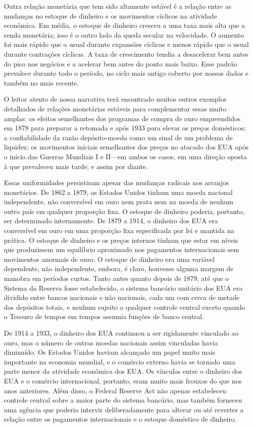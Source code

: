 \documentclass[a4paper,12pt]{article}[abntex2]
\begin{document}
Outra relação monetária que tem sido altamente estável é a relação entre as mudanças no estoque de dinheiro e os movimentos cíclicos na atividade econômica. Em média, o estoque de dinheiro cresceu a uma taxa mais alta que a renda monetária; isso é o outro lado da queda secular na velocidade. O aumento foi mais rápido que o usual durante expansões cíclicas e menos rápido que o usual durante contrações cíclicas. A taxa de crescimento tendia a desacelerar bem antes do pico nos negócios e a acelerar bem antes do ponto mais baixo. Esse padrão prevalece durante todo o período, no ciclo mais antigo coberto por nossos dados e também no mais recente.

O leitor atento de nossa narrativa terá encontrado muitos outros exemplos detalhados de relações monetárias estáveis para complementar essas muito amplas: os efeitos semelhantes dos programas de compra de ouro empreendidos em 1878 para preparar a retomada e após 1933 para elevar os preços domésticos; a confiabilidade da razão depósito-moeda como um sinal de um problema de liquidez; os movimentos iniciais semelhantes dos preços no atacado dos EUA após o início das Guerras Mundiais I e II—em ambos os casos, em uma direção oposta à que prevaleceu mais tarde; e assim por diante.

Essas uniformidades persistiram apesar das mudanças radicais nos arranjos monetários. De 1862 a 1879, os Estados Unidos tinham uma moeda nacional independente, não conversível em ouro nem prata nem na moeda de nenhum outro país em qualquer proporção fixa. O estoque de dinheiro poderia, portanto, ser determinado internamente. De 1879 a 1914, o dinheiro dos EUA era conversível em ouro em uma proporção fixa especificada por lei e mantida na prática. O estoque de dinheiro e os preços internos tinham que estar em níveis que produzissem um equilíbrio aproximado nos pagamentos internacionais sem movimentos anormais de ouro. O estoque de dinheiro era uma variável dependente, não independente, embora, é claro, houvesse alguma margem de manobra em períodos curtos. Tanto antes quanto depois de 1879, até que o Sistema da Reserva fosse estabelecido, o sistema bancário unitário dos EUA era dividido entre bancos nacionais e não nacionais, cada um com cerca de metade dos depósitos totais, e nenhum sujeito a qualquer controle central exceto quando o Tesouro de tempos em tempos assumia funções de banco central.

De 1914 a 1933, o dinheiro dos EUA continuou a ser rigidamente vinculado ao ouro, mas o número de outras moedas nacionais assim vinculadas havia diminuído. Os Estados Unidos haviam alcançado um papel muito mais importante na economia mundial, e o comércio externo havia se tornado uma parte menor da atividade econômica dos EUA. Os vínculos entre o dinheiro dos EUA e o comércio internacional, portanto, eram muito mais frouxos do que nos anos anteriores. Além disso, o Federal Reserve Act não apenas estabeleceu controle central sobre a maior parte do sistema bancário, mas também forneceu uma agência que poderia intervir deliberadamente para alterar ou até reverter a relação entre os pagamentos internacionais e o estoque doméstico de dinheiro.
\end{document}
